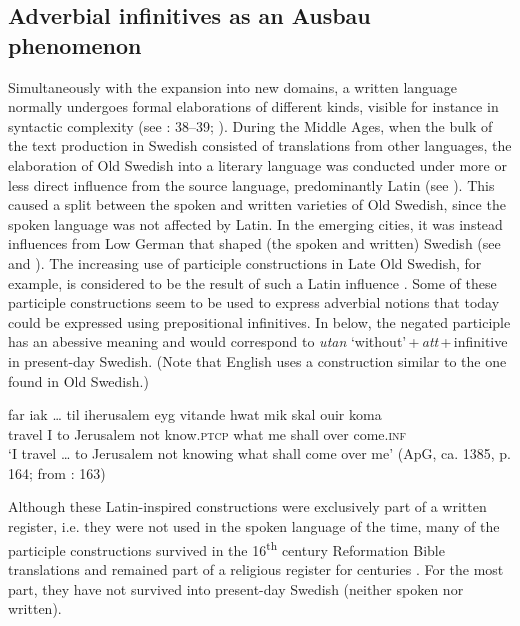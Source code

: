 \documentclass[output=paper]{langscibook}
\begin{document}
\subsection{Adverbial infinitives as an Ausbau phenomenon}\label{sec:kalm:5.2}


Simultaneously with the expansion into new domains, a written language normally undergoes formal elaborations of different kinds, visible for instance in syntactic complexity (see \citealt{Fischer2007}: 38–39; \citealt{Kloss1967}). During the Middle Ages, when the bulk of the text production in Swedish consisted of translations from other languages, the elaboration of Old Swedish into a literary language was conducted under more or less direct influence from the source language, predominantly Latin (see \citealt{Wollin1981,Wollin1983,Hoder2009, Hoder2010}). This caused a split between the spoken and written varieties of Old Swedish, since the spoken language was not affected by Latin. In the emerging cities, it was instead influences from Low German that shaped (the spoken and written) Swedish (see  and ). The increasing use of participle constructions in Late Old Swedish, for example, is considered to be the result of such a Latin influence \citep{Ahlberg1942,Hoder2010}. Some of these participle constructions seem to be used to express adverbial notions that today could be expressed using prepositional infinitives. In  below, the negated participle has an abessive meaning and would correspond to \textit{utan} ‘without’\,+\,\textit{att}\,+\,infinitive in present-day Swedish. (Note that English uses a construction similar to the one found in Old Swedish.)


\ea 
\label{ex:kalm:33}
 \gll far {iak …} til iherusalem eyg vitande hwat mik skal ouir koma\\ 
travel I to Jerusalem not know.\textsc{ptcp} what me shall over come.\textsc{inf}\\
 \glt ‘I travel … to Jerusalem not knowing what shall come over me’ (ApG, ca. 1385, p. 164; from \citealt{Ahlberg1942}: 163)
\z


Although these Latin-inspired constructions were exclusively part of a written register, i.e. they were not used in the spoken language of the time, many of the participle constructions survived in the 16\textsuperscript{th} century Reformation Bible translations and remained part of a religious register for centuries \citep[17–19]{Stahle1970}. For the most part, they have not survived into present-day Swedish (neither spoken nor written). 
\end{document}
